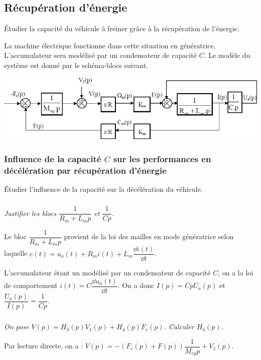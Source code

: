 \documentclass[10pt,fleqn]{article} %
\begin{document}
\begin{multicols}{2}
\subsection*{Récupération d'énergie}
\begin{obj}
Étudier la capacité du véhicule à freiner grâce à la récupération de l’énergie.
\end{obj}

La machine électrique fonctionne dans cette situation en génératrice.
L’accumulateur sera modélisé par un condensateur de capacité $C$.
Le modèle du système est donné par le schéma-blocs suivant.


\begin{center}
\includegraphics[width=\linewidth]{images/ccmp_04}
\end{center}


\subsubsection*{Influence de la capacité $C$ sur les performances en décélération par récupération d’énergie}
\begin{obj}
Étudier l’influence de la capacité sur la décélération du véhicule.
\end{obj}

\subparagraph{}
\textit{Justifier les blocs $\dfrac{1}{R_m+L_m p}$ et $\dfrac{1}{Cp}$.}
\ifprof
\begin{corrige}
Le bloc $\dfrac{1}{R_m+L_m p}$ provient de la loi des mailles en mode génératrice selon laquelle $e(t)=u_a(t)+R_m i(t)+L_m \dfrac{\dd i(t)}{\dd t}$.

L'accumulateur étant un modélisé par un condensateur de capacité $C$, on a la loi de comportement $i(t)=C\dfrac{\dd u_a(t)}{\dd t}$. On a donc $I(p)=CpU_a(p)$ et $\dfrac{U_a(p)}{I(p)}=\dfrac{1}{Cp}$.
\end{corrige}
\else
\fi


\subparagraph{}
\textit{On pose $V(p) = H_3(p) V_1(p) + H_4(p) F_r(p)$. Calculer $H_4(p)$.}
\ifprof
\begin{corrige}
Par lecture directe, on a : $V(p)=-\left( F_r(p)  + F(p)\right)\dfrac{1}{M_{eq}p} + V_1(p)$.


\end{corrige}
\end{multicols}
\end{document}
